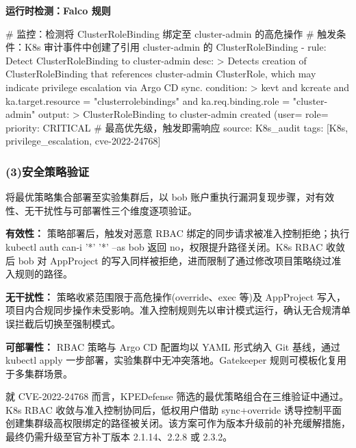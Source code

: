 \textbf{运行时检测：Falco 规则}
\begin{AppendixCode}
# 监控：检测将 ClusterRoleBinding 绑定至 cluster-admin 的高危操作
# 触发条件：K8s 审计事件中创建了引用 cluster-admin 的 ClusterRoleBinding
- rule: Detect ClusterRoleBinding to cluster-admin
  desc: >
    Detects creation of ClusterRoleBinding that references
    cluster-admin ClusterRole, which may indicate
    privilege escalation via Argo CD sync.
  condition: >
    kevt and kcreate and
    ka.target.resource = "clusterrolebindings" and
    ka.req.binding.role = "cluster-admin"
  output: >
    ClusterRoleBinding to cluster-admin created
    (user=%
    role=%
  priority: CRITICAL   # 最高优先级，触发即需响应
  source: K8s_audit
  tags: [K8s, privilege_escalation, cve-2022-24768]
\end{AppendixCode}


\subsubsection{(3)安全策略验证}

将最优策略集合部署至实验集群后，以 bob 账户重执行漏洞复现步骤，对有效性、无干扰性与可部署性三个维度逐项验证。

\noindent\textbf{有效性：}
策略部署后，触发对恶意 RBAC 绑定的同步请求被准入控制拒绝；执行 kubectl auth can-i '*' '*' --as bob 返回 no，权限提升路径关闭。K8s RBAC 收敛后 bob 对 AppProject 的写入同样被拒绝，进而限制了通过修改项目策略绕过准入规则的路径。

\noindent\textbf{无干扰性：}
策略收紧范围限于高危操作(override、exec 等)及 AppProject 写入，项目内合规同步操作未受影响。准入控制规则先以审计模式运行，确认无合规清单误拦截后切换至强制模式。

\noindent\textbf{可部署性：}
RBAC 策略与 Argo CD 配置均以 YAML 形式纳入 Git 基线，通过 kubectl apply 一步部署，实验集群中无冲突落地。Gatekeeper 规则可模板化复用于多集群场景。

就 CVE-2022-24768 而言，KPEDefense 筛选的最优策略组合在三维验证中通过。K8s RBAC 收敛与准入控制协同后，低权用户借助 sync\allowbreak+\allowbreak override 诱导控制平面创建集群级高权限绑定的路径被关闭。该方案可作为版本升级前的补充缓解措施，最终仍需升级至官方补丁版本 2.1.14、2.2.8 或 2.3.2。

